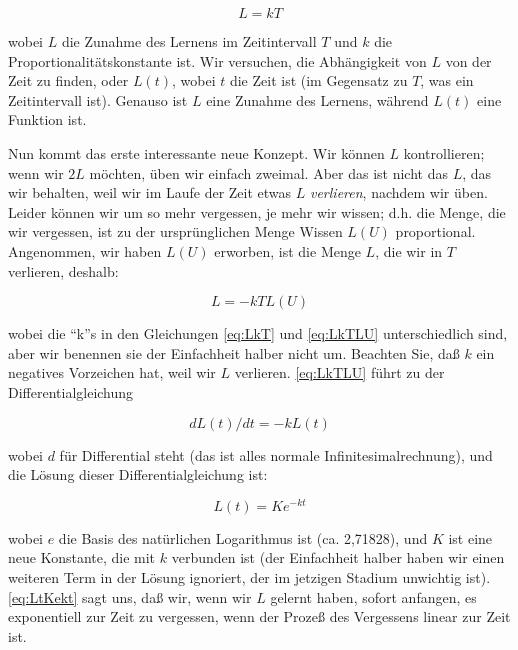 \begin{equation}
\label{eq:LkT}
 L=kT
\end{equation}

wobei $L$ die Zunahme des Lernens im Zeitintervall $T$ und $k$ die Proportionalitätskonstante ist.
Wir versuchen, die Abhängigkeit von $L$ von der Zeit zu finden, oder $L(t)$, wobei $t$ die Zeit ist (im Gegensatz zu $T$, was ein Zeitintervall ist).
Genauso ist $L$ eine Zunahme des Lernens, während $L(t)$ eine Funktion ist.

Nun kommt das erste interessante neue Konzept.
Wir können $L$ kontrollieren; wenn wir $2L$ möchten, üben wir einfach zweimal.
Aber das ist nicht das $L$, das wir behalten, weil wir im Laufe der Zeit etwas $L$ \textit{verlieren}, nachdem wir üben.
Leider können wir um so mehr vergessen, je mehr wir wissen; d.h. die Menge, die wir vergessen, ist zu der ursprünglichen Menge Wissen $L(U)$ proportional.
Angenommen, wir haben $L(U)$ erworben, ist die Menge $L$, die wir in $T$ verlieren, deshalb:

\begin{equation}
\label{eq:LkTLU}
 L= -kTL(U)
\end{equation}

wobei die \enquote{k}s in den Gleichungen \ref{eq:LkT} und \ref{eq:LkTLU} unterschiedlich sind, aber wir benennen sie der Einfachheit halber nicht um.
Beachten Sie, daß $k$ ein negatives Vorzeichen hat, weil wir $L$ verlieren.
\autoref{eq:LkTLU} führt zu der Differentialgleichung

\begin{equation}
 dL(t)/dt=-kL(t)
\end{equation}

wobei $d$ für Differential steht (das ist alles normale Infinitesimalrechnung), und die Lösung dieser Differentialgleichung ist:

\begin{equation}
\label{eq:LtKekt}
 L(t)=Ke^{-kt}
\end{equation}

wobei $e$ die Basis des natürlichen Logarithmus ist (ca. 2,71828), und $K$ ist eine neue Konstante, die mit $k$ verbunden ist (der Einfachheit halber haben wir einen weiteren Term in der Lösung ignoriert, der im jetzigen Stadium unwichtig ist).
\autoref{eq:LtKekt} sagt uns, daß wir, wenn wir $L$ gelernt haben, sofort anfangen, es exponentiell zur Zeit zu vergessen, wenn der Prozeß des Vergessens linear zur Zeit ist.

